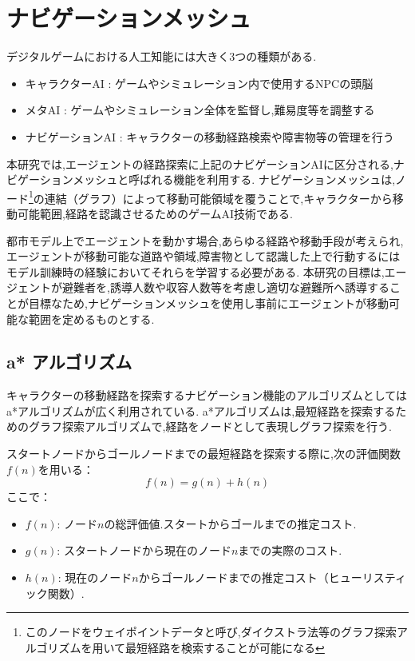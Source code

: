 \section{ナビゲーションメッシュ}
デジタルゲームにおける人工知能\cite{miyake2016}には大きく3つの種類がある.
\begin{itemize}
  \item キャラクターAI : ゲームやシミュレーション内で使用するNPCの頭脳
  \item メタAI : ゲームやシミュレーション全体を監督し,難易度等を調整する
  \item ナビゲーションAI : キャラクターの移動経路検索や障害物等の管理を行う
\end{itemize}

本研究では,エージェントの経路探索に上記のナビゲーションAIに区分される,ナビゲーションメッシュと呼ばれる機能を利用する.
ナビゲーションメッシュは,ノード\footnote{このノードをウェイポイントデータと呼び,ダイクストラ法等のグラフ探索アルゴリズムを用いて最短経路を検索することが可能になる}の連結（グラフ）によって移動可能領域を覆うことで,キャラクターから移動可能範囲,経路を認識させるためのゲームAI技術である.\par
都市モデル上でエージェントを動かす場合,あらゆる経路や移動手段が考えられ,エージェントが移動可能な道路や領域,障害物として認識した上で行動するにはモデル訓練時の経験においてそれらを学習する必要がある.
本研究の目標は,エージェントが避難者を,誘導人数や収容人数等を考慮し適切な避難所へ誘導することが目標なため,ナビゲーションメッシュを使用し事前にエージェントが移動可能な範囲を定めるものとする.


\subsection{a* アルゴリズム}
キャラクターの移動経路を探索するナビゲーション機能のアルゴリズムとしてはa*アルゴリズムが広く利用されている.
a*アルゴリズムは,最短経路を探索するためのグラフ探索アルゴリズムで,経路をノードとして表現しグラフ探索を行う.

スタートノードからゴールノードまでの最短経路を探索する際に,次の評価関数$f(n)$を用いる：
\[
f(n) = g(n) + h(n)
\]
ここで：
\begin{itemize}
    \item $f(n)$: ノード$n$の総評価値.スタートからゴールまでの推定コスト.
    \item $g(n)$: スタートノードから現在のノード$n$までの実際のコスト.
    \item $h(n)$: 現在のノード$n$からゴールノードまでの推定コスト（ヒューリスティック関数）.
\end{itemize}

